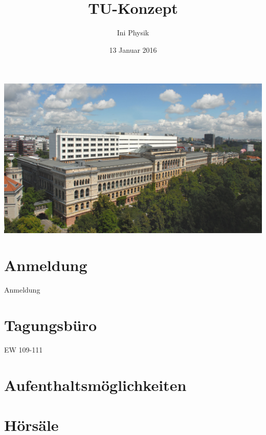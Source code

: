 \documentclass[compress,]{beamer}
\title[TU-Konzept]{TU-Konzept}
\author{Ini Physik}
\institute[TU Berlin]
\begin{document}
\subject{Konzept an der TU}
\date{13 Januar 2016}

\begin{frame}
\begin{center}
\includegraphics[scale=0.3]{images/HvomPhysikgeb10-7-07-2_ohneKran_03.jpg}
\end{center}
\titlepage
\vspace{-2.5cm}
\end{frame}


\frame{\tableofcontents}


\section{Anmeldung}


\begin{frame}{Anmeldung}
\end{frame}


\section{Tagungsbüro}


\begin{frame}{EW 109-111}
\end{frame}


\section{Aufenthaltsmöglichkeiten}


\begin{frame}
\end{frame}


\section{Hörsäle}
\end{document}
